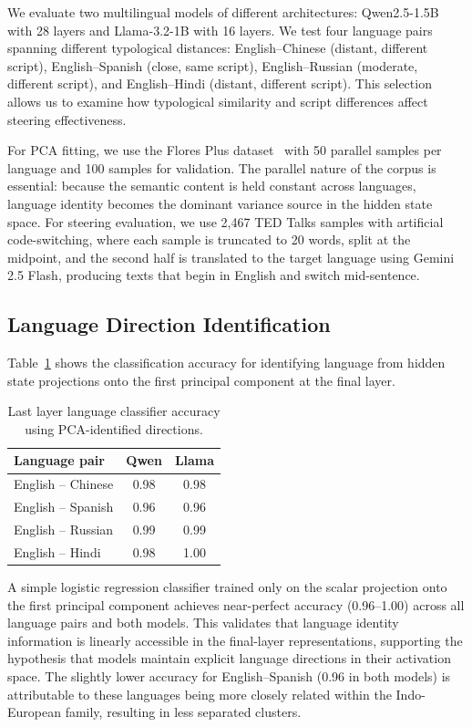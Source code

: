 We evaluate two multilingual models of different architectures: Qwen2.5-1.5B with 28 layers and Llama-3.2-1B with 16 layers. We test four language pairs spanning different typological distances: English--Chinese (distant, different script), English--Spanish (close, same script), English--Russian (moderate, different script), and English--Hindi (distant, different script). This selection allows us to examine how typological similarity and script differences affect steering effectiveness.

For PCA fitting, we use the Flores Plus dataset~\cite{nllb2024} with 50 parallel samples per language and 100 samples for validation. The parallel nature of the corpus is essential: because the semantic content is held constant across languages, language identity becomes the dominant variance source in the hidden state space. For steering evaluation, we use 2,467 TED Talks samples with artificial code-switching, where each sample is truncated to 20 words, split at the midpoint, and the second half is translated to the target language using Gemini 2.5 Flash, producing texts that begin in English and switch mid-sentence.

\subsection{Language Direction Identification}

Table~\ref{tab:lang_classification} shows the classification accuracy for identifying language from hidden state projections onto the first principal component at the final layer.

\begin{table}[!htb]
    \centering
    \caption{Last layer language classifier accuracy using PCA-identified directions.}
    \begin{tabular}{lcc}
    \toprule
    Language pair & Qwen & Llama \\
    \midrule
    English -- Chinese & 0.98 & 0.98 \\
    English -- Spanish & 0.96 & 0.96 \\
    English -- Russian & 0.99 & 0.99 \\
    English -- Hindi & 0.98 & 1.00 \\
    \bottomrule
    \end{tabular}
    \label{tab:lang_classification}
\end{table}

A simple logistic regression classifier trained only on the scalar projection onto the first principal component achieves near-perfect accuracy (0.96--1.00) across all language pairs and both models. This validates that language identity information is linearly accessible in the final-layer representations, supporting the hypothesis that models maintain explicit language directions in their activation space. The slightly lower accuracy for English--Spanish (0.96 in both models) is attributable to these languages being more closely related within the Indo-European family, resulting in less separated clusters.

